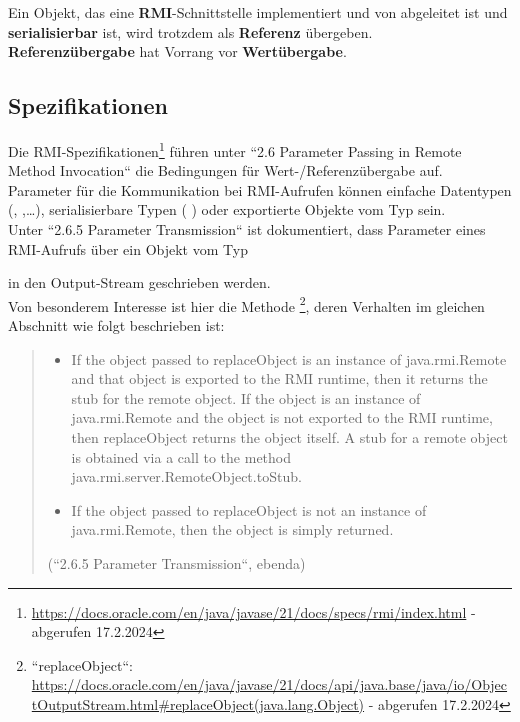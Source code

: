\begin{tcolorbox}[enlarge top by=0.5cm,enlarge bottom by=0.5cm]
    \item Ein Objekt, das eine \textbf{RMI}-Schnittstelle implementiert und von  abgeleitet ist und \textbf{serialisierbar} ist, wird trotzdem als \textbf{Referenz} übergeben.\\

    \noindent
    \textbf{Referenzübergabe} hat Vorrang vor \textbf{Wertübergabe}.
\end{tcolorbox}


\subsection*{Spezifikationen}

Die RMI-Spezifikationen\footnote{
\url{https://docs.oracle.com/en/java/javase/21/docs/specs/rmi/index.html} - abgerufen 17.2.2024
} führen unter ``2.6 Parameter Passing in Remote Method Invocation`` die Bedingungen für Wert-/Referenzübergabe auf.\\
Parameter für die Kommunikation bei RMI-Aufrufen können einfache Datentypen (,  ,\ldots), serialisierbare Typen ( ) oder exportierte Objekte vom Typ  sein.\\
Unter ``2.6.5 Parameter Transmission`` ist dokumentiert, dass Parameter eines RMI-Aufrufs über ein Objekt vom Typ \begin{center}\end{center} in den Output-Stream geschrieben werden.\\
Von besonderem Interesse ist hier die Methode \footnote{
   ``replaceObject``: \url{https://docs.oracle.com/en/java/javase/21/docs/api/java.base/java/io/ObjectOutputStream.html#replaceObject(java.lang.Object)} - abgerufen 17.2.2024
}, deren Verhalten im gleichen Abschnitt wie folgt beschrieben ist:

\blockquote[{(``2.6.5 Parameter Transmission``, ebenda)}]{
    \begin{itemize}
        \item  If the object passed to replaceObject is an instance of java.rmi.Remote and that object is exported to the RMI runtime, then it returns the stub for the remote object. If the object is an instance of java.rmi.Remote and the object is not exported to the RMI runtime, then replaceObject returns the object itself. A stub for a remote object is obtained via a call to the method java.rmi.server.RemoteObject.toStub.
    \item If the object passed to replaceObject is not an instance of java.rmi.Remote, then the object is simply returned.
    \end{itemize}
}




